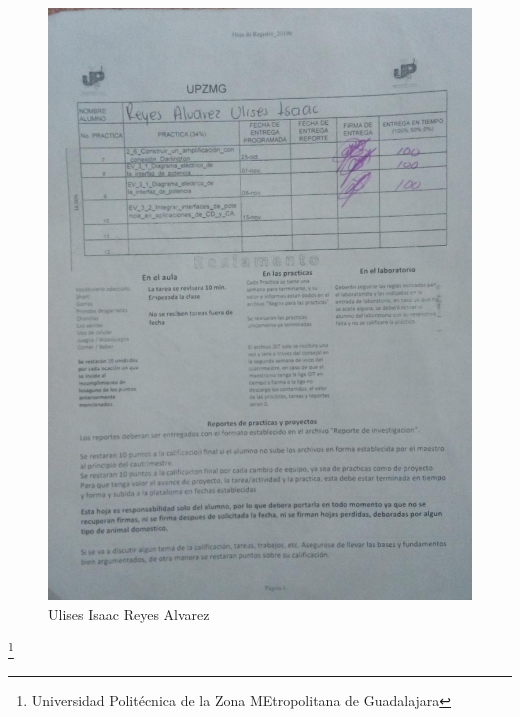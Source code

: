\documentclass[10pt,a4paper]{article}
\begin{document}
\newpage
\begin{figure}[hbtp]
\centering
\includegraphics[scale=0.4]{Pictures/ULISES.png}
\caption{Ulises Isaac Reyes Alvarez}
\end{figure}
\footnote{Universidad Politécnica de la Zona MEtropolitana de Guadalajara}
\end{document}
